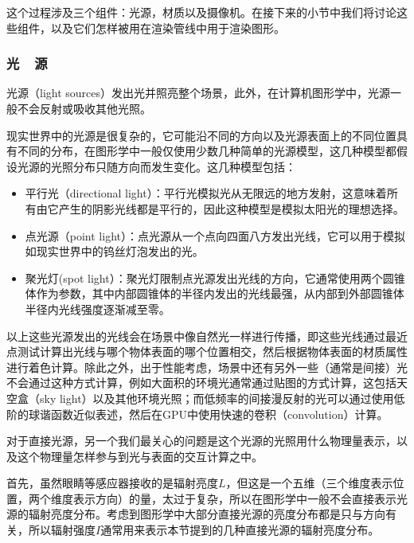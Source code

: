 这个过程涉及三个组件：光源，材质以及摄像机。在接下来的小节中我们将讨论这些组件，以及它们怎样被用在渲染管线中用于渲染图形。




\subsubsection{光~~源}\label{sec:intro-light-sources}
光源（light sources）发出光并照亮整个场景，此外，在计算机图形学中，光源一般不会反射或吸收其他光照。

现实世界中的光源是很复杂的，它可能沿不同的方向以及光源表面上的不同位置具有不同的分布，在图形学中一般仅使用少数几种简单的光源模型，这几种模型都假设光源的光照分布只随方向而发生变化。这几种模型包括：

\begin{itemize}
	\item 平行光（directional light）：平行光模拟光从无限远的地方发射，这意味着所有由它产生的阴影光线都是平行的，因此这种模型是模拟太阳光的理想选择。
	\item 点光源（point light）：点光源从一个点向四面八方发出光线，它可以用于模拟如现实世界中的钨丝灯泡发出的光。
	\item 聚光灯(spot light）：聚光灯限制点光源发出光线的方向，它通常使用两个圆锥体作为参数，其中内部圆锥体的半径内发出的光线最强，从内部到外部圆锥体半径内光线强度逐渐减至零。
\end{itemize}

以上这些光源发出的光线会在场景中像自然光一样进行传播，即这些光线通过最近点测试计算出光线与哪个物体表面的哪个位置相交，然后根据物体表面的材质属性进行着色计算。除此之外，出于性能考虑，场景中还有另外一些（通常是间接）光不会通过这种方式计算，例如大面积的环境光通常通过贴图的方式计算，这包括天空盒（sky light）以及其他环境光照；而低频率的间接漫反射的光可以通过使用低阶的球谐函数近似表述，然后在GPU中使用快速的卷积（convolution）计算。

对于直接光源，另一个我们最关心的问题是这个光源的光照用什么物理量表示，以及这个物理量怎样参与到光与表面的交互计算之中。

首先，虽然眼睛等感应器接收的是辐射亮度$L$，但这是一个五维（三个维度表示位置，两个维度表示方向）的量，太过于复杂，所以在图形学中一般不会直接表示光源的辐射亮度分布。考虑到图形学中大部分直接光源的亮度分布都是只与方向有关，所以辐射强度$I$通常用来表示本节提到的几种直接光源的辐射亮度分布。

